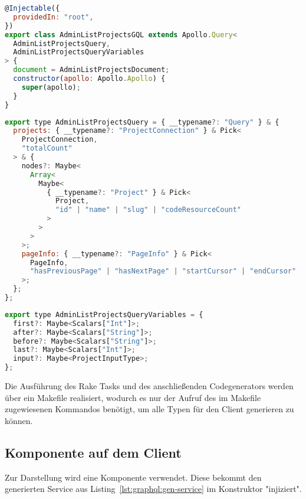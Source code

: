 \begin{lstlisting}[language=JavaScript,float=h!,caption={Generierter Service enthält den Aufruf der Query als Instanzvariable}, label={lst:graphql:gen-service}]
@Injectable({
  providedIn: "root",
})
export class AdminListProjectsGQL extends Apollo.Query<
  AdminListProjectsQuery,
  AdminListProjectsQueryVariables
> {
  document = AdminListProjectsDocument;
  constructor(apollo: Apollo.Apollo) {
    super(apollo);
  }
}
\end{lstlisting}

\begin{lstlisting}[language=JavaScript,float=h!,caption={Generierter Antworttyp}, label={lst:graphql:gen-responsetype}]
export type AdminListProjectsQuery = { __typename?: "Query" } & {
  projects: { __typename?: "ProjectConnection" } & Pick<
    ProjectConnection,
    "totalCount"
  > & {
    nodes?: Maybe<
      Array<
        Maybe<
          { __typename?: "Project" } & Pick<
            Project,
            "id" | "name" | "slug" | "codeResourceCount"
          >
        >
      >
    >;
    pageInfo: { __typename?: "PageInfo" } & Pick<
      PageInfo,
      "hasPreviousPage" | "hasNextPage" | "startCursor" | "endCursor"
    >;
  };
};
\end{lstlisting}
\begin{lstlisting}[language=JavaScript,float=h!,caption={Generierter Parametertyp}, label={lst:graphql:gen-variables}]
export type AdminListProjectsQueryVariables = {
  first?: Maybe<Scalars["Int"]>;
  after?: Maybe<Scalars["String"]>;
  before?: Maybe<Scalars["String"]>;
  last?: Maybe<Scalars["Int"]>;
  input?: Maybe<ProjectInputType>;
};
\end{lstlisting}


Die Ausführung des Rake Tasks und des anschließenden Codegenerators werden über ein Makefile realisiert, wodurch es nur der Aufruf des im Makefile zugewiesenen Kommandos benötigt, um alle Typen für den Client generieren zu können. 

\subsection{Komponente auf dem Client}

Zur Darstellung wird eine Komponente verwendet. Diese bekommt den generierten Service aus Listing~\ref{lst:graphql:gen-service} im Konstruktor "injiziert". 

